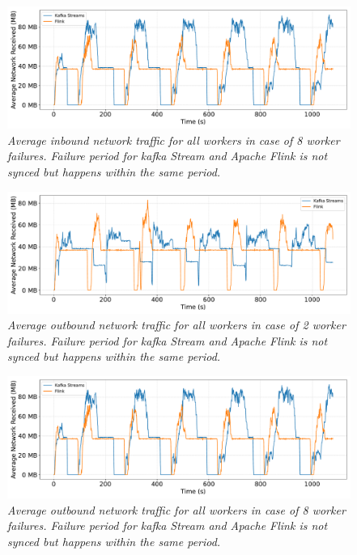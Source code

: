 \begin{figure}[H]
    \centering
    \includegraphics[width=1\textwidth]{figures/kafka-flink/network-received-8pod-kafka-flink}
    \caption{\textit{Average inbound network traffic for all workers in case of 8 worker failures.
    Failure period for kafka Stream and Apache Flink is not synced but happens within the same period.}}
    \label{fig:kafka-flink-received-8}
\end{figure}

\begin{figure}[H]
    \centering
    \includegraphics[width=1\textwidth]{figures/kafka-flink/network-received-2pod-kafka-flink}
    \caption{\textit{Average outbound network traffic for all workers in case of 2 worker failures.
    Failure period for kafka Stream and Apache Flink is not synced but happens within the same period.}}
    \label{fig:kafka-flink-transmitted-2}
\end{figure}


\begin{figure}[H]
    \centering
    \includegraphics[width=1\textwidth]{figures/kafka-flink/network-received-8pod-kafka-flink}
    \caption{\textit{Average outbound network traffic for all workers in case of 8 worker failures.
    Failure period for kafka Stream and Apache Flink is not synced but happens within the same period.}}
    \label{fig:kafka-flink-transmitted-8}
\end{figure}

